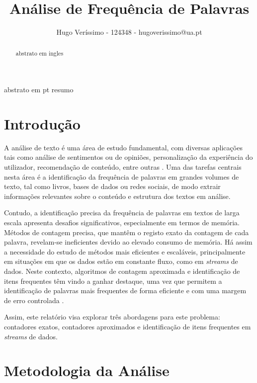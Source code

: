 \documentclass[mirror, portugues]{revdetua}
\begin{document}

\title{Análise de Frequência de Palavras}
\author{Hugo Veríssimo - 124348 - hugoverissimo@ua.pt}
\maketitle

\begin{abstract}
abstrato em ingles
\end{abstract}

\begin{resumo}
abstrato em pt resumo
\end{resumo}


\section{Introdução}

A análise de texto é uma área de estudo fundamental, com diversas aplicações tais como análise de sentimentos ou de opiniões, personalização da experiência do utilizador, recomendação de conteúdo, entre outras \cite{AZ24}. Uma das tarefas centrais nesta área é a identificação da frequência de palavras em grandes volumes de texto, tal como livros, bases de dados ou redes sociais, de modo extrair informações relevantes sobre o conteúdo e estrutura dos textos em análise.

Contudo, a identificação precisa da frequência de palavras em textos de larga escala apresenta desafios significativos, especialmente em termos de memória. Métodos de contagem precisa, que mantêm o registo exato da contagem de cada palavra, revelam-se ineficientes devido ao elevado consumo de memória. Há assim a necessidade do estudo de métodos mais eficientes e escaláveis, principalmente em situações em que os dados estão em constante fluxo, como em \textit{streams} de dados. Neste contexto, algoritmos de contagem aproximada e identificação de itens frequentes têm vindo a ganhar destaque, uma vez que permitem a identificação de palavras mais frequentes de forma eficiente e com uma margem de erro controlada \cite{LH06}.

Assim, este relatório visa explorar três abordagens para este problema: contadores exatos, contadores aproximados e identificação de itens frequentes em \textit{streams} de dados.


\section{Metodologia da Análise}
\end{document}
